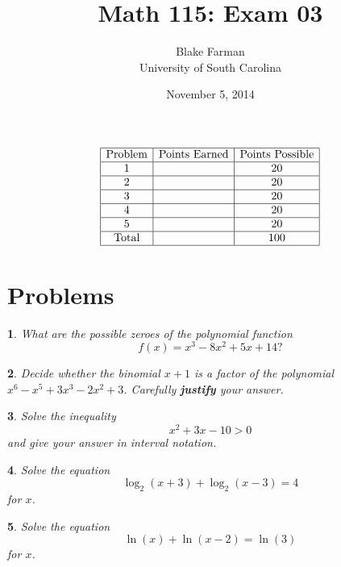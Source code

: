 \documentclass[12pt]{amsart}
\author{Blake Farman\\University of South Carolina}
\title{Math 115: Exam 03}
\date{November 5, 2014}
\begin{document}
\maketitle

\begin{center}
\end{center}

\vspace{0.2in}
\vspace{0.2in}

$$
\begin{array}{|c|c|c|}
  \hline
  \text{Problem} & \text{Points Earned} & \text{Points Possible}\\
  \hline
  1 & & 20\\
  \hline
  2 & & 20\\
  \hline
  3 & & 20\\
  \hline
  4 & & 20\\
  \hline
  5 & & 20 \\
  \hline
  \text{Total} & & 100\\
  \hline
\end{array}
$$

\newpage

\theoremstyle{plain}
\newtheorem{thm}{}
\newtheorem{lem}{Lemma}
\theoremstyle{definition}
\newtheorem{defn}{Definition}

\section{Problems}

\begin{thm}
  What are the possible zeroes of the polynomial function
  $$f(x) = x^3 - 8x^2 + 5x + 14\text{?}$$
\end{thm}

\newpage

\begin{thm}
  Decide whether the binomial $x + 1$ is a factor of the polynomial $x^6 - x^5 + 3x^3 - 2x^2 + 3$.
  Carefully {\bf justify} your answer.
\end{thm}

\newpage
\begin{thm}
  Solve the inequality
  $$x^2 + 3x - 10 > 0$$
  and give your answer in interval notation.
\end{thm}

\newpage

\begin{thm}
  Solve the equation
  $$\log_2(x + 3) + \log_2(x  -3) = 4$$
  for $x$.
\end{thm}

\newpage

\begin{thm}\label{5}
  Solve the equation
  $$\ln(x) + \ln(x - 2) = \ln(3)$$
  for $x$.
\end{thm}
\end{document}
